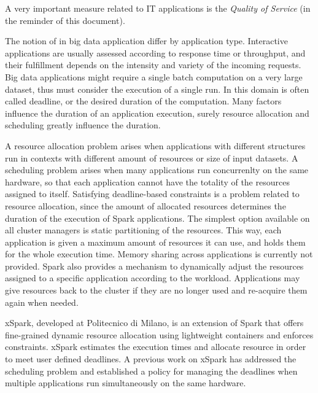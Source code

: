 
A very important measure related to IT applications is the \textit{Quality of Service} (\qos in the reminder of this document).

The notion of \qos in big data application differ by application type. Interactive applications are usually assessed according to response time or throughput, and their fulfillment depends on the intensity and variety of the incoming requests. Big data applications might require a single batch computation on a very large dataset, thus \qos must consider the execution of a single run. In this domain \qos is often called deadline, or the desired duration of the computation. Many factors influence the duration of an application execution, surely resource allocation and scheduling greatly influence the duration. 

A resource allocation problem arises when applications with different structures run in contexts with different amount of resources or size of input datasets. A scheduling problem arises when many applications run concurrenlty on the same hardware, so that each application cannot have the totality of the resources assigned to itself. Satisfying deadline-based \qos constraints is a problem related to resource allocation, since the amount of allocated resources determines the duration of the execution of Spark applications. The simplest option available on all cluster managers is static partitioning of the resources. This way, each application is given a maximum amount of resources it can use, and holds them for the whole execution time. Memory sharing across applications is currently not provided. Spark also provides a mechanism to dynamically adjust the resources assigned to a specific application according to the workload. Applications may give resources back to the cluster if they are no longer used and re-acquire them again when needed.

xSpark, developed at Politecnico di Milano, is an extension of Spark that offers fine-grained dynamic resource allocation using lightweight containers and enforces \qos constraints. xSpark estimates the execution times and allocate resource in order to meet user defined deadlines. A previous work on xSpark has addressed the scheduling problem and established a policy for managing the deadlines when multiple applications run simultaneously on the same hardware.

